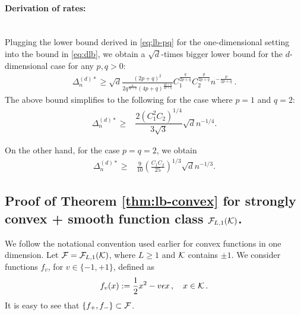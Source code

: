 \paragraph{Derivation of rates:}\ \\
Plugging the lower bound derived in \eqref{eq:lb-pq} for the one-dimensional setting into the bound in \eqref{eq:dlb}, we obtain a $\sqrt{d}$-times bigger lower bound for the $d$-dimensional case for any $p, q >0$:
\begin{align}
\Delta_n^{(d)*} \ge  \sqrt{d} \frac{\left(2p+q\right)^2}{2q^{\frac{q}{2p+q}}\left(4p+q\right)^{\frac{4p+q}{2p+q}}}C_1^{\frac{q}{2p+q}} C_2^{\frac{p}{2p+q}}  n^{-\tfrac{p}{2p+q}} \,.
\label{eq:lb-pq-d}
\end{align}
The above bound simplifies to the following for the case where $p=1$ and $q=2$:
\begin{align*}
\Delta_n^{(d)*}  \ge& \dfrac{ 2(C_1^2C_2)^{1/4}}{3\sqrt{3}} \sqrt{d}n^{-1/4}.
\end{align*}

On the other hand, for the case $p=q=2$, we obtain
\begin{align*}
\Delta_n^{(d)*}  \ge& \frac{9}{10}\left(\frac{C_1 C_2}{25}\right)^{1/3} \sqrt{d}n^{-1/3}.
\end{align*}

\subsection{Proof of Theorem \ref{thm:lb-convex} for strongly convex + smooth function class $\mathcal{F}_{L,1}(\mathcal{K})$.}
\label{sec:appendix-lbscconvex}
We follow the notational convention used earlier for convex functions in one dimension. 
Let $\mathcal{F} = \mathcal{F}_{L,1}(\mathcal{K})$, where $L\ge 1$ and $\mathcal{K}$  contains $\pm 1$.
We consider functions $f_v$, for $v \in \{-1,+1\}$, defined as
\begin{align}
  f_v(x) := \dfrac{1}{2} x^2 - v\epsilon x \,,\quad x \in \mathcal{K}\,.
  \label{eq:socfdef}
\end{align}
It is easy to see that $\{f_+, f_-\}\subset \mathcal{F}$.


